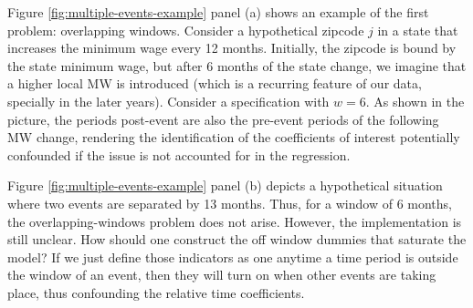     Figure \ref{fig:multiple-events-example} panel (a) shows an example of the first problem: overlapping windows. Consider a hypothetical zipcode $j$ in a state that increases the minimum wage every 12 months. Initially, the zipcode is bound by the state minimum wage, but after 6 months of the state change, we imagine that a higher local MW is introduced (which is a recurring feature of our data, specially in the later years). Consider a specification with $w = 6$. As shown in the picture, the periods post-event are also the pre-event periods of the following MW change, rendering the identification of the coefficients of interest potentially confounded if the issue is not accounted for in the regression.
    
    Figure \ref{fig:multiple-events-example} panel (b) depicts a hypothetical situation where two events are separated by 13 months. Thus, for a window of 6 months, the overlapping-windows problem does not arise. However, the implementation is still unclear. How should one construct the off window dummies that saturate the model? If we just define those indicators as one anytime a time period is outside the window of an event, then they will turn on when other events are taking place, thus confounding the relative time coefficients.
    
